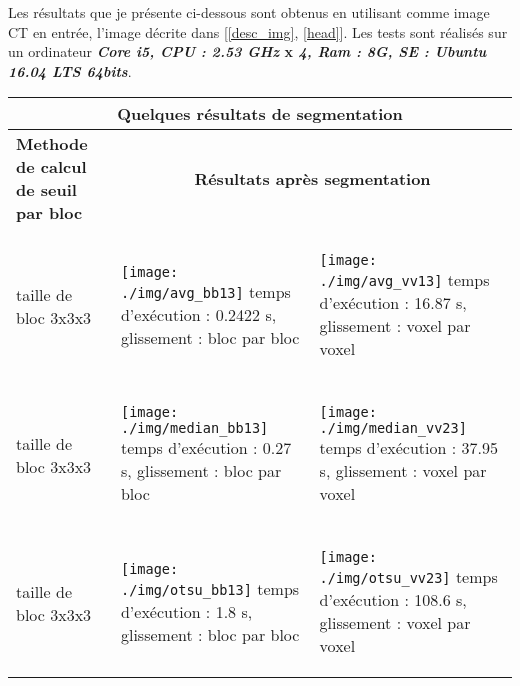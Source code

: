 Les résultats que je présente ci-dessous sont obtenus en utilisant comme image CT en entrée, l'image décrite dans [\ref{desc_img}, \ref{head}]. Les tests sont réalisés sur un ordinateur \textbf{\textit{Core i5, CPU : 2.53 GHz} x \textit{4, Ram : 8G, SE : Ubuntu 16.04 LTS 64bits}}.

\begin{longtable}{ |p{3cm}|p{5.5cm}|p{5.5cm}|  }
\hline
\multicolumn{3}{|c|}{\textbf{Quelques résultats de segmentation}} \\
\hline
\textbf{Methode de calcul de seuil par bloc} & \multicolumn{2}{|c|}{\textbf{Résultats après segmentation}}\\
\hline

\begin{center}
	Moyenne,\\ taille de bloc 3x3x3
\end{center} & 
\begin{center}
\texttt{[image: ./img/avg\_bb13]}
temps d'exécution : 0.2422 s, glissement : bloc par bloc
\end{center}  & 
\begin{center}
\texttt{[image: ./img/avg\_vv13]}
temps d'exécution : 16.87 s, glissement : voxel par voxel
\end{center}\\
\hline

\begin{center}
	Médiane,\\ taille de bloc 3x3x3
\end{center} & 
\begin{center}
	\texttt{[image: ./img/median\_bb13]}
	temps d'exécution : 0.27 s, glissement : bloc par bloc
\end{center}  & 
\begin{center}
	\texttt{[image: ./img/median\_vv23]}
	temps d'exécution : 37.95 s, glissement : voxel par voxel
\end{center}\\
\hline

\begin{center}
	Otsu,\\ taille de bloc 3x3x3
\end{center} & 
\begin{center}
	\texttt{[image: ./img/otsu\_bb13]}
	temps d'exécution : 1.8 s, glissement : bloc par bloc
\end{center}  & 
\begin{center}
	\texttt{[image: ./img/otsu\_vv23]}
	temps d'exécution : 108.6 s, glissement : voxel par voxel
\end{center}\\
\hline

\end{longtable}
